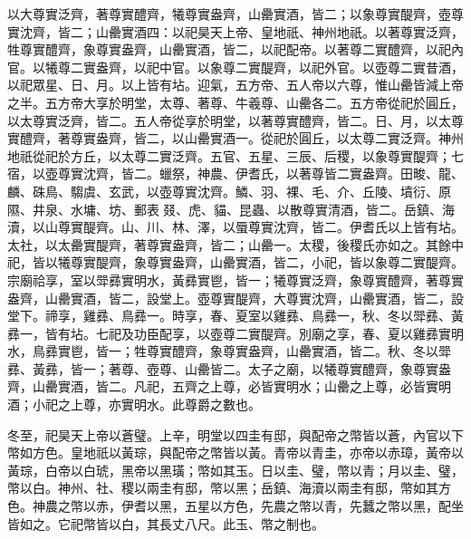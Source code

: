 \begin{pinyinscope}
 以大尊實泛齊，著尊實醴齊，犧尊實盎齊，山罍實酒，皆二；以象尊實醍齊，壺尊實沈齊，皆二；山罍實酒四：以祀昊天上帝、皇地祇、神州地祇。以著尊實泛齊，牲尊實醴齊，象尊實盎齊，山罍實酒，皆二，以祀配帝。以著尊二實醴齊，以祀內官。以犧尊二實盎齊，以祀中官。以象尊二實醍齊，以祀外官。以壺尊二實昔酒，以祀眾星、日、月。以上皆有坫。迎氣，五方帝、五人帝以六尊，惟山罍皆減上帝之半。五方帝大享於明堂，太尊、著尊、牛羲尊、山罍各二。五方帝從祀於圓丘，以太尊實泛齊，皆二。五人帝從享於明堂，以著尊實醴齊，皆二。日、月，以太尊實醴齊，著尊實盎齊，皆二，以山罍實酒一。從祀於圓丘，以太尊二實泛齊。神州地祇從祀於方丘，以太尊二實泛齊。五官、五星、三辰、后稷，以象尊實醍齊；七宿，以壺尊實沈齊，皆二。蠟祭，神農、伊耆氏，以著尊皆二實盎齊。田畯、龍、麟、硃鳥、騶虞、玄武，以壺尊實沈齊。鱗、羽、裸、毛、介、丘陵、墳衍、原隰、井泉、水墉、坊、郵表叕、虎、貓、昆蟲、以散尊實清酒，皆二。岳鎮、海瀆，以山尊實醍齊。山、川、林、澤，以蜃尊實沈齊，皆二。伊耆氏以上皆有坫。太社，以太罍實醍齊，著尊實盎齊，皆二；山罍一。太稷，後稷氏亦如之。其餘中祀，皆以犧尊實醍齊，象尊實盎齊，山罍實酒，皆二，小祀，皆以象尊二實醍齊。宗廟祫享，室以斝彞實明水，黃彞實鬯，皆一；犧尊實泛齊，象尊實醴齊，著尊實盎齊，山罍實酒，皆二，設堂上。壺尊實醍齊，大尊實沈齊，山罍實酒，皆二，設堂下。禘享，雞彞、鳥彞一。時享，春、夏室以雞彞、鳥彞一，秋、冬以斝彞、黃彞一，皆有坫。七祀及功臣配享，以壺尊二實醍齊。別廟之享，春、夏以雞彞實明水，鳥彞實鬯，皆一；牲尊實醴齊，象尊實盎齊，山罍實酒，皆二。秋、冬以斝彞、黃彞，皆一；著尊、壺尊、山罍皆二。太子之廟，以犧尊實醴齊，象尊實盎齊，山罍實酒，皆二。凡祀，五齊之上尊，必皆實明水；山罍之上尊，必皆實明酒；小祀之上尊，亦實明水。此尊爵之數也。



 冬至，祀昊天上帝以蒼璧。上辛，明堂以四圭有邸，與配帝之幣皆以蒼，內官以下幣如方色。皇地祇以黃琮，與配帝之幣皆以黃。青帝以青圭，亦帝以赤璋，黃帝以黃琮，白帝以白琥，黑帝以黑璜；幣如其玉。日以圭、璧，幣以青；月以圭、璧，幣以白。神州、社、稷以兩圭有邸，幣以黑；岳鎮、海瀆以兩圭有邸，幣如其方色。神農之幣以赤，伊耆以黑，五星以方色，先農之幣以青，先蠶之幣以黑，配坐皆如之。它祀幣皆以白，其長丈八尺。此玉、幣之制也。




\end{pinyinscope}
